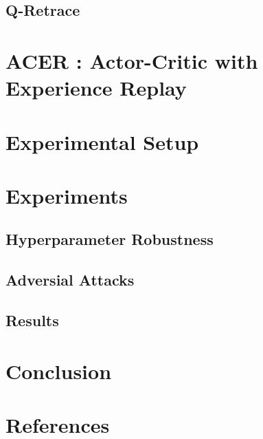 \subsection{Q-Retrace}
\pagebreak
\pagebreak
\section{ACER : Actor-Critic with Experience Replay}

\pagebreak
\section{Experimental Setup}
\pagebreak
\section{Experiments}\raggedbottom 
\subsection{Hyperparameter Robustness}
\subsection{Adversial Attacks}
\pagebreak
\subsection{Results}
\section{Conclusion}
\pagebreak
\section{References}